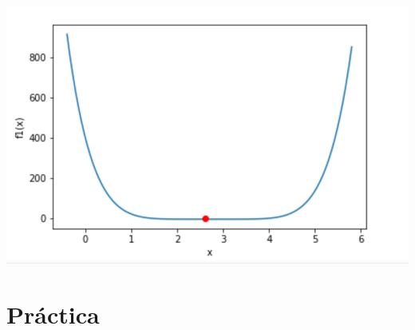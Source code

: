 \documentclass[10pt,letterpaper]{article}
\begin{document}
\begin{enumerate}
\begin{enumerate}
                    \begin{center}
                        \includegraphics[scale=.6]{assets/theory/1-a/f2-minimum.png}
                    \end{center}

                    \clearpage

            \end{enumerate}
    \end{enumerate}

\section{Práctica}
\end{document}
